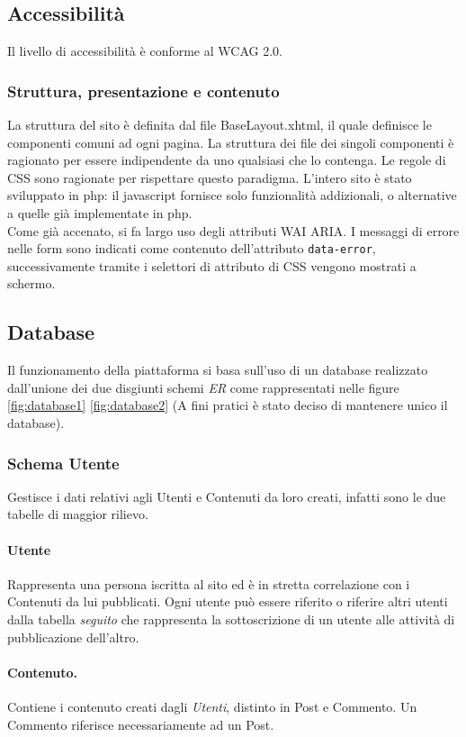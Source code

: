 \documentclass[12pt, a4paper]{article}
\begin{document}
    \subsection{Accessibilità}
    Il livello di accessibilità è conforme al WCAG 2.0.
    \subsubsection*{Struttura, presentazione e contenuto}
    La struttura del sito è definita dal file BaseLayout.xhtml, il quale definisce le componenti comuni ad ogni pagina. La struttura dei file dei singoli componenti è ragionato per essere indipendente da uno qualsiasi che lo contenga. Le regole di CSS sono ragionate per rispettare questo paradigma. L'intero sito è stato sviluppato in php: il javascript fornisce solo funzionalità addizionali, o alternative a quelle già implementate in php. \\
    Come già accenato, si fa largo uso degli attributi WAI ARIA. 
    I messaggi di errore nelle form sono indicati come contenuto dell'attributo \texttt{data-error}, successivamente tramite i selettori di attributo di CSS vengono mostrati a schermo.

    \newpage
    \subsection{Database}
    Il funzionamento della piattaforma si basa sull'uso di un database realizzato dall'unione dei due disgiunti schemi \emph{ER}
    come rappresentati nelle figure \ref{fig:database1} \ref{fig:database2} (A fini pratici è stato deciso di mantenere unico il database).
    \subsubsection{Schema Utente}
    Gestisce i dati relativi agli Utenti e Contenuti da loro creati, infatti sono le due tabelle di maggior rilievo.
    \paragraph{Utente}Rappresenta una persona iscritta al sito ed è in stretta correlazione con i Contenuti da lui pubblicati.
    Ogni utente può essere riferito o riferire altri utenti dalla tabella \emph{seguito}
    che rappresenta la sottoscrizione di un utente alle attività di pubblicazione dell'altro.
    \paragraph{Contenuto.} Contiene i contenuto creati dagli \emph{Utenti}, distinto in
    Post e Commento. Un Commento riferisce necessariamente ad un Post.
\end{document}
